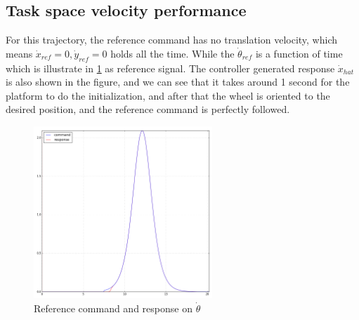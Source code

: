 \subsection{Task space velocity performance}
For this trajectory, the reference command has no translation velocity, which means $\dot{x}_{ref}=0, \dot{y}_{ref}=0$ holds all the time. While the $\dot{\theta}_{ref}$ is a function of time which is illustrate in \cref{fig:PR_t} as reference signal. The controller generated response $\dot{x}_{hat}$ is also shown in the figure, and we can see that it takes around 1 second for the platform to do the initialization, and after that the wheel is oriented to the desired position, and the reference command is perfectly followed.
\begin{figure}[!h]
    \centering
    \includegraphics[width=0.6\textwidth]{Figures/PR_t.png}  
    \caption{Reference command and response on $\dot{\theta}$}
    \label{fig:PR_t}
\end{figure}

